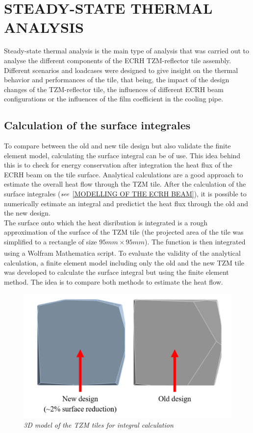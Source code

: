 \section{STEADY-STATE THERMAL ANALYSIS}
\normalsize{Steady-state thermal analysis is the main type of analysis that was carried out to analyse the different components of the \acrshort{ECRH} \acrshort{TZM}-reflector tile assembly. Different scenarios and loadcases were designed to give insight on the thermal behavior and performances of the tile, that being, the impact of the design changes of the \acrshort{TZM}-reflector tile, the influences of different \acrshort{ECRH} beam configurations or the influences of the film coefficient in the cooling pipe.}
\subsection{Calculation of the surface integrales} \label{Calculation of the surface integrales}
\normalsize{To compare between the old and new tile design but also validate the finite element model, calculating the surface integral can be of use. This idea behind this is to check for energy conservation after integration the heat flux of the \acrshort{ECRH} beam on the tile surface. Analytical calculations are a good approach to estimate the overall heat flow through the \acrshort{TZM} tile. After the calculation of the surface integrales ($\it{see}$ \ref{MODELLING OF THE ECRH BEAM}), it is possible to numerically estimate an integral and predictict the heat flux through the old and the new design.}
\\
\break
\normalsize{\indent The surface onto which the heat disribution is integrated is a rough approximation of the surface of the \acrshort{TZM} tile (the projected area of the tile was simplified to a rectangle of size $95mm \times 95mm$). The function is then integrated using a Wolfram Mathematica\textsuperscript{\textregistered} script. To evaluate the validity of the analytical calculation, a finite element model including only the old and the new \acrshort{TZM} tile was developed to calculate the surface integral but using the finite element method. The idea is to compare both methods to estimate the heat flow. }
\\
\begin{figure}[h!]
    \label{fig_5_1} 
    \centering
    \includegraphics[width=.7\textwidth]{figures/standalonetilemodel.png}
    \caption{\it 3D model of the TZM tiles for integral calculation}
    \label{fig:5.1}
\end{figure}
